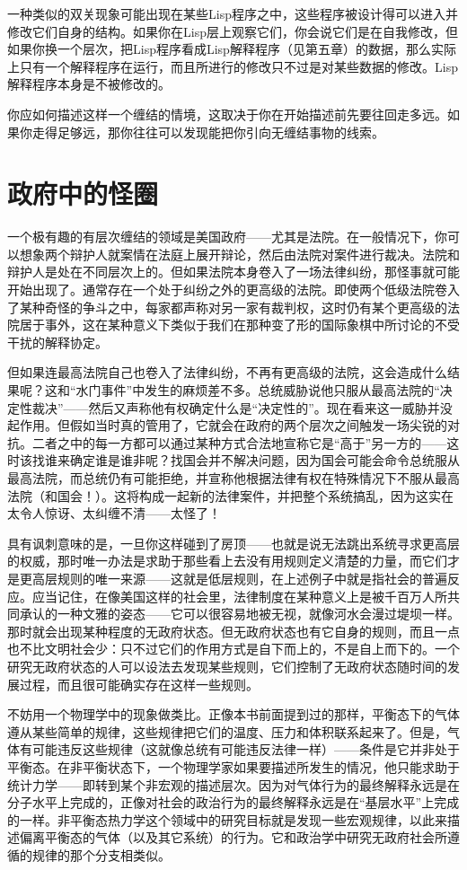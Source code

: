 一种类似的双关现象可能出现在某些Lisp程序之中，这些程序被设计得可以进入并修改它们自身的结构。如果你在Lisp层上观察它们，你会说它们是在自我修改，但如果你换一个层次，把Lisp程序看成Lisp解释程序（见第五章）的数据，那么实际上只有一个解释程序在运行，而且所进行的修改只不过是对某些数据的修改。Lisp解释程序本身是不被修改的。

你应如何描述这样一个缠结的情境，这取决于你在开始描述前先要往回走多远。如果你走得足够远，那你往往可以发现能把你引向无缠结事物的线索。

\section{政府中的怪圈}

一个极有趣的有层次缠结的领域是美国政府——尤其是法院。在一般情况下，你可以想象两个辩护人就案情在法庭上展开辩论，然后由法院对案件进行裁决。法院和辩护人是处在不同层次上的。但如果法院本身卷入了一场法律纠纷，那怪事就可能开始出现了。通常存在一个处于纠纷之外的更高级的法院。即使两个低级法院卷入了某种奇怪的争斗之中，每家都声称对另一家有裁判权，这时仍有某个更高级的法院居于事外，这在某种意义下类似于我们在那种变了形的国际象棋中所讨论的不受干扰的解释协定。

但如果连最高法院自己也卷入了法律纠纷，不再有更高级的法院，这会造成什么结果呢？这和“水门事件”中发生的麻烦差不多。总统威胁说他只服从最高法院的“决定性裁决”——然后又声称他有权确定什么是“决定性的”。现在看来这一威胁并没起作用。但假如当时真的管用了，它就会在政府的两个层次之间触发一场尖锐的对抗。二者之中的每一方都可以通过某种方式合法地宣称它是“高于”另一方的——这时该找谁来确定谁是谁非呢？找国会并不解决问题，因为国会可能会命令总统服从最高法院，而总统仍有可能拒绝，并宣称他根据法律有权在特殊情况下不服从最高法院（和国会！）。这将构成一起新的法律案件，并把整个系统搞乱，因为这实在太令人惊讶、太纠缠不清——太怪了！

具有讽刺意味的是，一旦你这样碰到了房顶——也就是说无法跳出系统寻求更高层的权威，那时唯一办法是求助于那些看上去没有用规则定义清楚的力量，而它们才是更高层规则的唯一来源——这就是低层规则，在上述例子中就是指社会的普遍反应。应当记住，在像美国这样的社会里，法律制度在某种意义上是被千百万人所共同承认的一种文雅的姿态——它可以很容易地被无视，就像河水会漫过堤坝一样。那时就会出现某种程度的无政府状态。但无政府状态也有它自身的规则，而且一点也不比文明社会少：只不过它们的作用方式是自下而上的，不是自上而下的。一个研究无政府状态的人可以设法去发现某些规则，它们控制了无政府状态随时间的发展过程，而且很可能确实存在这样一些规则。

不妨用一个物理学中的现象做类比。正像本书前面提到过的那样，平衡态下的气体遵从某些简单的规律，这些规律把它们的温度、压力和体积联系起来了。但是，气体有可能违反这些规律（这就像总统有可能违反法律一样）——条件是它并非处于平衡态。在非平衡状态下，一个物理学家如果要描述所发生的情况，他只能求助于统计力学——即转到某个非宏观的描述层次。因为对气体行为的最终解释永远是在分子水平上完成的，正像对社会的政治行为的最终解释永远是在“基层水平”上完成的一样。非平衡态热力学这个领域中的研究目标就是发现一些宏观规律，以此来描述偏离平衡态的气体（以及其它系统）的行为。它和政治学中研究无政府社会所遵循的规律的那个分支相类似。

